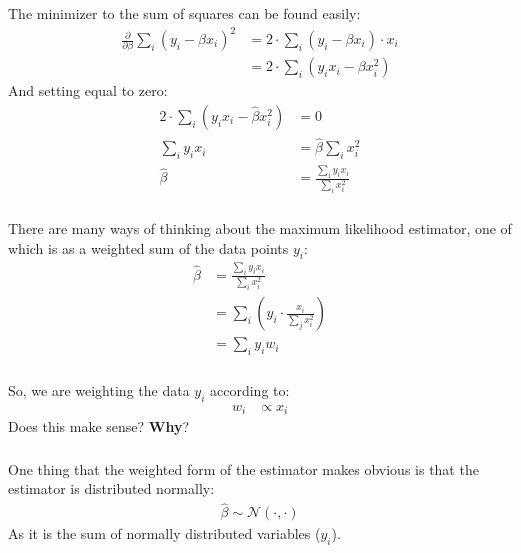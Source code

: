 \begin{frame}[fragile] \frametitle{}

The minimizer to the sum of squares can be found easily:
\begin{align}
\frac{\partial}{\partial \beta} \sum_i (y_i - \beta x_i)^2
  &= 2 \cdot \sum_i ( y_i - \beta x_i) \cdot x_i \\
  &= 2 \cdot \sum_i ( y_i x_i - \beta x_i^2)
\end{align}
And setting equal to zero:
\begin{align}
2 \cdot \sum_i ( y_i x_i - \widehat{\beta} x_i^2) &= 0 \\
\sum_i y_i x_i &= \widehat{\beta} \sum_i x_i^2 \\
\widehat{\beta} &= \frac{\sum_i y_i x_i}{\sum_i x_i^2}
\end{align}

\end{frame}

\begin{frame}[fragile] \frametitle{}

There are many ways of thinking about the maximum likelihood estimator,
one of which is as a weighted sum of the data points $y_i$:
\begin{align}
\widehat{\beta} &= \frac{\sum_i y_i x_i}{\sum_i x_i^2} \\
&= \sum_i \left( y_i \cdot \frac{x_i}{\sum_j x_i^2} \right) \\
&= \sum_i y_i w_i
\end{align}

\end{frame}

\begin{frame}[fragile] \frametitle{}

So, we are weighting the data $y_i$ according to:
\begin{align}
w_i &\propto x_i
\end{align}
Does this make sense? {\bf Why}?

\end{frame}

\begin{frame}[fragile] \frametitle{}

One thing that the weighted form of the estimator makes
obvious is that the estimator is distributed normally:
\begin{align}
\widehat{\beta} \sim \mathcal{N} (\cdot, \cdot)
\end{align}
As it is the sum of normally distributed variables ($y_i$).

\end{frame}


